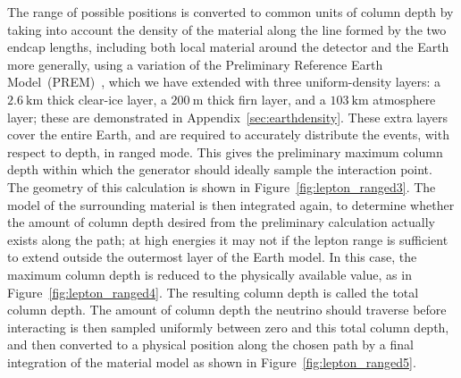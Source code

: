 \documentclass[main.tex]{subfiles}
\begin{document}
The range of possible positions is converted to common units of column depth by taking into account the density of the material along the line formed by the two endcap lengths, including both local material around the detector and the Earth more generally, using a variation of the Preliminary Reference Earth Model~(PREM)~\cite{DZIEWONSKI1981297}, which we have extended with three uniform-density layers: a $\SI{2.6}\km$ thick clear-ice layer, a $\SI{200}\m$ thick firn layer, and a $\SI{103}\km$ atmosphere layer; these are demonstrated in Appendix~\ref{sec:earthdensity}.
These extra layers cover the entire Earth, and are required to accurately distribute the events, with respect to depth, in ranged mode.
This gives the preliminary maximum column depth within which the generator should ideally sample the interaction point.
The geometry of this calculation is shown in Figure~\ref{fig:lepton_ranged3}.
The model of the surrounding material is then integrated again, to determine whether the amount of column depth desired from the preliminary calculation actually exists along the path; at high energies it may not if the lepton range is sufficient to extend outside the outermost layer of the Earth model.
In this case, the maximum column depth is reduced to the physically available value, as in Figure~\ref{fig:lepton_ranged4}.
The resulting column depth is called the total column depth.
The amount of column depth the neutrino should traverse before interacting is then sampled uniformly between zero and this total column depth, and then converted to a physical position along the chosen path by a final integration of the material model as shown in Figure~\ref{fig:lepton_ranged5}.
\end{document}
